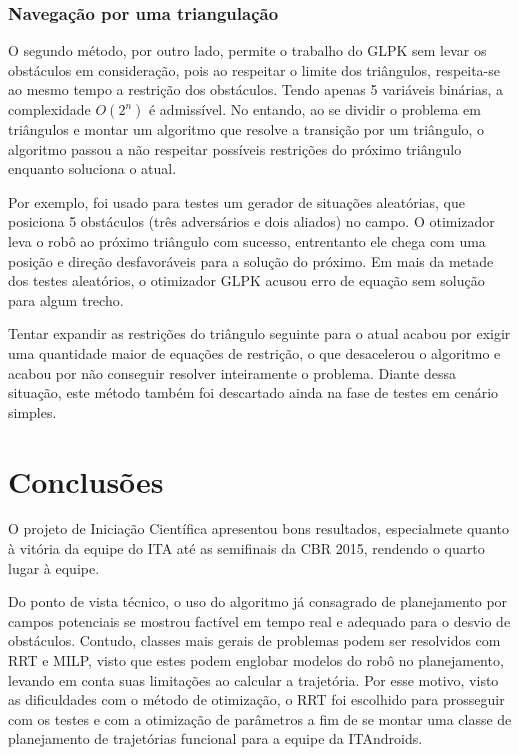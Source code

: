 \documentclass[a4paper,12pt]{article}
\begin{document}
\subsubsection{Navegação por uma triangulação}

O segundo método, por outro lado, permite o trabalho do GLPK sem levar os obstáculos em consideração, pois ao respeitar o limite dos triângulos, respeita-se ao mesmo tempo a restrição dos obstáculos. Tendo apenas 5 variáveis binárias, a complexidade $O(2^n)$ é admissível. No entando, ao se dividir o problema em triângulos e montar um algoritmo que resolve a transição por um triângulo, o algoritmo passou a não respeitar possíveis restrições do próximo triângulo enquanto soluciona o atual.

Por exemplo, foi usado para testes um gerador de situações aleatórias, que posiciona 5 obstáculos (três adversários e dois aliados) no campo. O otimizador leva o robô ao próximo triângulo com sucesso, entrentanto ele chega com uma posição e direção desfavoráveis para a solução do próximo. Em mais da metade dos testes aleatórios, o otimizador GLPK acusou erro de equação sem solução para algum trecho.

Tentar expandir as restrições do triângulo seguinte para o atual acabou por exigir uma quantidade maior de equações de restrição, o que desacelerou o algoritmo e acabou por não conseguir resolver inteiramente o problema. Diante dessa situação, este método também foi descartado ainda na fase de testes em cenário simples.

\section{Conclusões}

O projeto de Iniciação Científica apresentou bons resultados, especialmete quanto à vitória da equipe do ITA até as semifinais da CBR 2015, rendendo o quarto lugar à equipe. 

Do ponto de vista técnico, o uso do algoritmo já consagrado de planejamento por campos potenciais se mostrou factível em tempo real e adequado para o desvio de obstáculos. Contudo, classes mais gerais de problemas podem ser resolvidos com RRT e MILP, visto que estes podem englobar modelos do robô no planejamento, levando em conta suas limitações ao calcular a trajetória. Por esse motivo, visto as dificuldades com o método de otimização, o RRT foi escolhido para prosseguir com os testes e com a otimização de parâmetros a fim de se montar uma classe de planejamento de trajetórias funcional para a equipe da ITAndroids.
\end{document}
